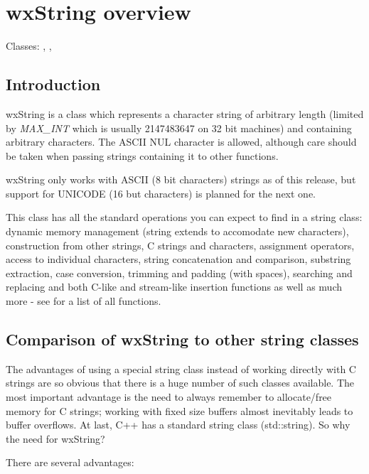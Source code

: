 \section{wxString overview}\label{wxstringoverview}

Classes: , , 

\subsection{Introduction}

wxString is a class which represents a character string of arbitrary length (limited by 
{\it MAX\_INT} which is usually 2147483647 on 32 bit machines) and containing
arbitrary characters. The ASCII NUL character is allowed, although care should be
taken when passing strings containing it to other functions.

wxString only works with ASCII (8 bit characters) strings as of this release,
but support for UNICODE (16 but characters) is planned for the next one.

This class has all the standard operations you can expect to find in a string class:
dynamic memory management (string extends to accomodate new characters),
construction from other strings, C strings and characters, assignment operators,
access to individual characters, string concatenation and comparison, substring
extraction, case conversion, trimming and padding (with spaces), searching and
replacing and both C-like  and stream-like
insertion functions as well as much more - see  
for a list of all functions.

\subsection{Comparison of wxString to other string classes}

The advantages of using a special string class instead of working directly with
C strings are so obvious that there is a huge number of such classes available.
The most important advantage is the need to always
remember to allocate/free memory for C strings; working with fixed size buffers almost
inevitably leads to buffer overflows. At last, C++ has a standard string class
(std::string). So why the need for wxString?

There are several advantages:

